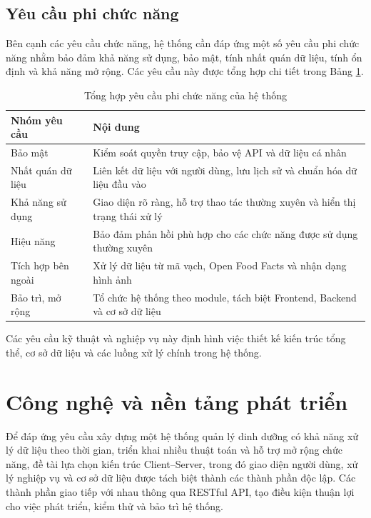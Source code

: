 \documentclass[12pt, a4paper]{report}
\begin{document}
\subsection{Yêu cầu phi chức năng}
Bên cạnh các yêu cầu chức năng, hệ thống cần đáp ứng một số yêu cầu phi chức năng nhằm bảo đảm khả năng sử dụng, bảo mật, tính nhất quán dữ liệu, tính ổn định và khả năng mở rộng. Các yêu cầu này được tổng hợp chi tiết trong Bảng \ref{tab:tong_hop_phi_chuc_nang}.

\begin{table}[htbp]
    \centering
    \caption{Tổng hợp yêu cầu phi chức năng của hệ thống}
\label{tab:tong_hop_phi_chuc_nang}
    \vspace{4pt}
    \renewcommand{\arraystretch}{1.3}
    \begin{tabular}{|>{\raggedright\arraybackslash}p{4cm}|p{11cm}|}
        \hline
        \textbf{Nhóm yêu cầu} & \textbf{Nội dung} \\
        \hline
        Bảo mật & Kiểm soát quyền truy cập, bảo vệ API và dữ liệu cá nhân \\
        \hline
        Nhất quán dữ liệu & Liên kết dữ liệu với người dùng, lưu lịch sử và chuẩn hóa dữ liệu đầu vào \\
        \hline
        Khả năng sử dụng & Giao diện rõ ràng, hỗ trợ thao tác thường xuyên và hiển thị trạng thái xử lý \\
        \hline
        Hiệu năng & Bảo đảm phản hồi phù hợp cho các chức năng được sử dụng thường xuyên \\
        \hline
        Tích hợp bên ngoài & Xử lý dữ liệu từ mã vạch, Open Food Facts và nhận dạng hình ảnh \\
        \hline
        Bảo trì, mở rộng & Tổ chức hệ thống theo module, tách biệt Frontend, Backend và cơ sở dữ liệu \\
        \hline
    \end{tabular}
\end{table}

Các yêu cầu kỹ thuật và nghiệp vụ này định hình việc thiết kế kiến trúc tổng thể, cơ sở dữ liệu và các luồng xử lý chính trong hệ thống.

\section{Công nghệ và nền tảng phát triển}Để đáp ứng yêu cầu xây dựng một hệ thống quản lý dinh dưỡng có khả năng xử lý dữ liệu theo thời gian, triển khai nhiều thuật toán và hỗ trợ mở rộng chức năng, đề tài lựa chọn kiến trúc Client–Server, trong đó giao diện người dùng, xử lý nghiệp vụ và cơ sở dữ liệu được tách biệt thành các thành phần độc lập. Các thành phần giao tiếp với nhau thông qua RESTful API, tạo điều kiện thuận lợi cho việc phát triển, kiểm thử và bảo trì hệ thống.
\end{document}
